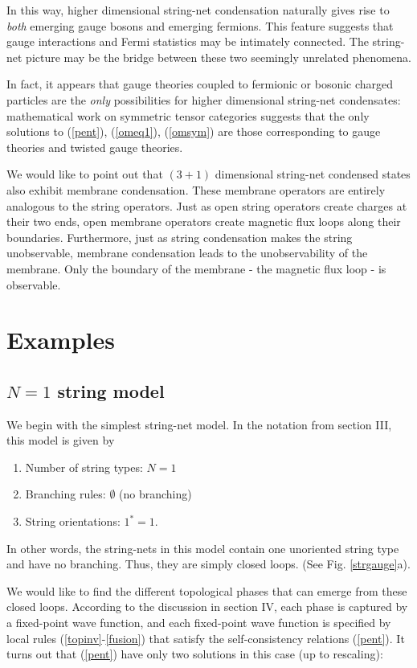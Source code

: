 \documentclass[aps,twocolumn,groupedaddress,showpacs,floatfix]{revtex4}
\begin{document}
In this way, higher dimensional string-net condensation naturally gives rise
to \emph{both} emerging gauge bosons and emerging fermions. This feature 
suggests that gauge interactions and Fermi statistics may be intimately 
connected. The string-net picture may be the bridge between these two 
seemingly unrelated phenomena. \cite{LWsta}

In fact, it appears that gauge theories coupled to fermionic or bosonic charged
particles are the \emph{only} possibilities for higher dimensional string-net 
condensates: mathematical work on symmetric tensor categories suggests
that the only solutions to (\ref{pent}), (\ref{omeq1}), (\ref{omsym}) are
those corresponding to gauge theories and twisted gauge theories. \cite{EG0337}

We would like to point out that $(3+1)$ dimensional string-net condensed
states also exhibit membrane condensation. These membrane operators are
entirely analogous to the string operators. Just as open string operators
create charges at their two ends, open membrane operators create magnetic 
flux 
loops along their boundaries. Furthermore, just as string condensation makes
the string unobservable, membrane condensation leads to the unobservability
of the membrane. Only the boundary of the membrane - the magnetic flux loop - 
is observable.
  
\section{Examples}

\subsection{$N=1$ string model}
\label{Z2SemI}

We begin with the simplest string-net model. In the notation from section III, 
this model is given by 
\begin{enumerate}
\item{Number of string types: $N=1$}
\item{Branching rules: $\emptyset$ (no branching)} 
\item{String orientations: $1^*=1$. }
\end{enumerate}
In other words, the string-nets in this model contain one unoriented string 
type and have no branching. Thus, they are simply closed loops. (See 
Fig. \ref{strgauge}a).

We would like to find the different topological phases that can emerge from 
these closed loops. According to the discussion in section IV, each phase is 
captured by a fixed-point wave function, and each fixed-point wave function is 
specified by local rules (\ref{topinv}-\ref{fusion}) that satisfy the 
self-consistency relations (\ref{pent}). It 
turns out that (\ref{pent}) have only two solutions in this case (up to 
rescaling):
\end{document}
